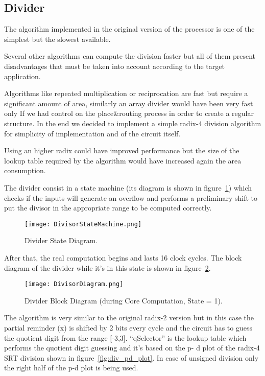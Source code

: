 \subsection{Divider}


The algorithm implemented in the original version of the processor is one of the simplest but the
slowest available.

Several other algorithms can compute the division faster but all of them present disadvantages
that must be taken into account according to the target application.

Algorithms like repeated multiplication or reciprocation are fast but require a significant amount
of area, similarly an array divider would have been very fast only If we had control on the
place\&routing process in order to create a regular structure. In the end we decided to implement
a simple radix-4 division algorithm for simplicity of implementation and of the circuit itself.

Using an higher radix could have improved performance but the size of the lookup table required
by the algorithm would have increased again the area consumption.

The divider consist in a state machine (its diagram is shown in figure~\ref{fig:div_state_dia}) which checks if the inputs will
generate an overflow and performs a preliminary shift to put the divisor in the appropriate range
to be computed correctly.


\begin{figure}[H]
\centering
\texttt{[image: DivisorStateMachine.png]}
\caption{Divider State Diagram.}
\label{fig:div_state_dia}
\end{figure}

After that, the real computation begins and lasts 16 clock cycles. The block diagram of the divider
while it's in this state is shown in figure~\ref{fig:div_block_dia}.

\begin{figure}[H]
\centering
\texttt{[image: DivisorDiagram.png]}
\caption{Divider Block Diagram (during Core Computation, State = 1).}
\label{fig:div_block_dia}
\end{figure}

The algorithm is very similar to the original radix-2 version but in this case the partial reminder (x)
is shifted by 2 bits every cycle and the circuit has to guess the quotient digit from the range [-3,3].
``qSelector'' is the lookup table which performs the quotient digit guessing and it's based on the p-
d plot of the radix-4 SRT division shown in figure~\ref{fig:div_pd_plot}. In case of unsigned division only the right half of
the p-d plot is being used.

